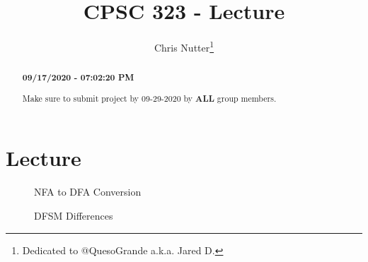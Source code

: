 \documentclass[12pt,a4paper]{article}
\title{CPSC 323 - Lecture}
\author{Chris Nutter\thanks{Dedicated to @QuesoGrande a.k.a. Jared D.}}
\begin{document}
\maketitle

\begin{abstract}
    \noindent
    \begin{center}\textbf{09/17/2020 - 07:02:20 PM}\end{center}
        Make sure to submit project by 09-29-2020 by \textbf{ALL} group members.
    
\end{abstract}


\section{Lecture}
    \begin{figure}[!htb]
        \centering
        \caption{NFA to DFA Conversion}
    \end{figure}
    \begin{figure}[!htb]
        \centering
        \caption{DFSM Differences}
    \end{figure}



\end{document}
